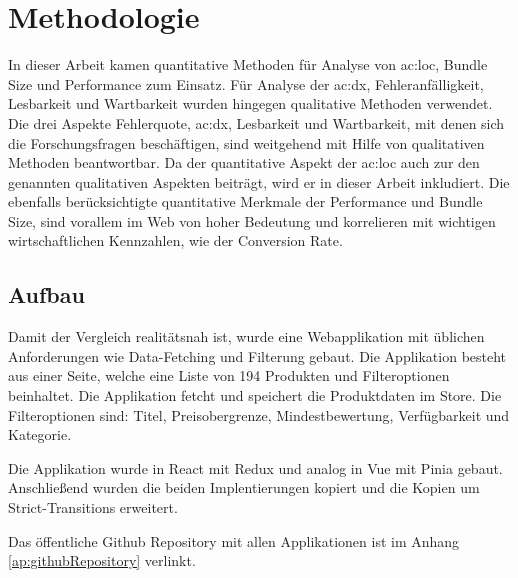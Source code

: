 \chapter{Methodologie}


In dieser Arbeit kamen quantitative Methoden für Analyse von \acrshort{ac:loc}, Bundle Size und Performance zum Einsatz. Für Analyse der \acrlong{ac:dx}, Fehleranfälligkeit, Lesbarkeit und Wartbarkeit wurden hingegen qualitative Methoden verwendet. Die drei Aspekte Fehlerquote, \acrshort{ac:dx}, Lesbarkeit und Wartbarkeit, mit denen sich die Forschungsfragen beschäftigen, sind weitgehend mit Hilfe von qualitativen Methoden beantwortbar. Da der quantitative Aspekt der \acrshort{ac:loc} auch zur den genannten qualitativen Aspekten beiträgt, wird er in dieser Arbeit inkludiert. Die ebenfalls berücksichtigte quantitative Merkmale der Performance und Bundle Size, sind vorallem im Web von hoher Bedeutung und korrelieren mit wichtigen wirtschaftlichen Kennzahlen, wie der Conversion Rate.\cite{googleConversionRateSpeed}

\section {Aufbau}

Damit der Vergleich realitätsnah ist, wurde eine Webapplikation mit üblichen Anforderungen wie Data-Fetching und Filterung gebaut. Die Applikation besteht aus einer Seite, welche eine Liste von 194 Produkten und Filteroptionen beinhaltet. Die Applikation fetcht und speichert die Produktdaten im Store. Die Filteroptionen sind: Titel, Preisobergrenze, Mindestbewertung, Verfügbarkeit und Kategorie.

Die Applikation wurde in React mit Redux und analog in Vue mit Pinia gebaut. Anschließend wurden die beiden Implentierungen kopiert und die Kopien um Strict-Transitions erweitert. 

Das öffentliche Github Repository mit allen Applikationen ist im Anhang \ref{ap:githubRepository} verlinkt.

